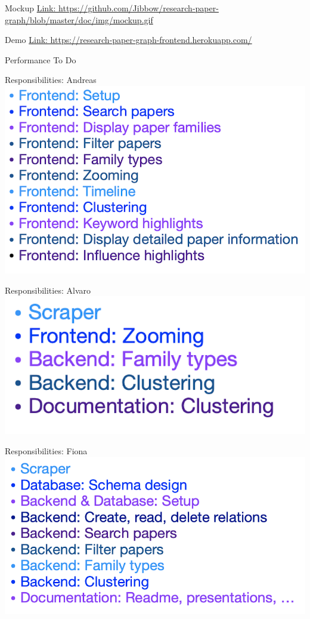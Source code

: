 \documentclass{beamer}
\begin{document}
\begin{frame}{Mockup}
    \url{Link: https://github.com/Jibbow/research-paper-graph/blob/master/doc/img/mockup.gif}
\end{frame}

\begin{frame}{Demo}
    \url{Link: https://research-paper-graph-frontend.herokuapp.com/}
\end{frame}

\begin{frame}{Performance}
{To Do}
\end{frame}

\begin{frame}{Responsibilities: Andreas}
    \includegraphics{img_22.png}
\end{frame}

\begin{frame}{Responsibilities: Alvaro}
    \includegraphics{img_23.png}
\end{frame}

\begin{frame}{Responsibilities: Fiona}
    \includegraphics{img_24.png}
\end{frame}
\end{document}

